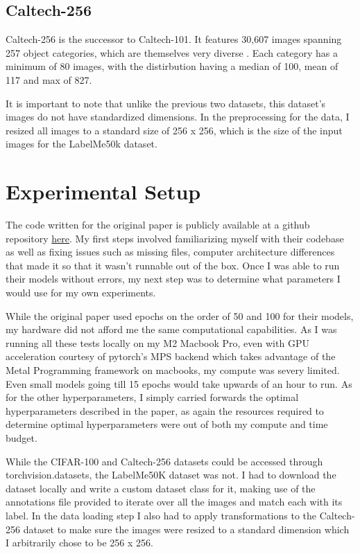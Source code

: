 \documentclass{article}
\theoremstyle{plain}
\theoremstyle{definition}
\theoremstyle{remark}
\begin{document}
\subsection*{Caltech-256}

Caltech-256 is the successor to Caltech-101. It features 30,607 images spanning 
257 object categories, which are themselves very diverse \cite{caltech256}. Each category 
has a minimum of 80 images, with the distirbution having a median of 100, mean of 117 and max of 
827. 

It is important to note that unlike the previous two datasets, this dataset's images do not have standardized dimensions. 
In the preprocessing for the data, I resized all images to a standard size of 256 x 256, which is the size 
of the input images for the LabelMe50k dataset.

\section{Experimental Setup}

The code written for the original paper \cite{alonso2024understanding} is publicly available at a 
github repository \href{https://github.com/nalonso2/PredictiveCoding-MQSeqIL/tree/main}{here}. My first steps 
involved familiarizing myself with their codebase as well as fixing issues such as missing files, computer 
architecture differences that made it so that it wasn't runnable out of the box. Once I was able to run their models 
without errors, my next step was to determine what parameters I would use for my own experiments. 

While the original paper used epochs on the order of 50 and 100 for their models, my hardware did not afford me the same 
computational capabilities. As I was running all these tests locally on my M2 Macbook Pro, even with GPU acceleration courtesy of 
pytorch's MPS backend which takes advantage of the Metal Programming framework on macbooks, my compute was severy limited. Even small models 
going till 15 epochs would take upwards of an hour to run. As for the other hyperparameters, I simply carried forwards the optimal 
hyperparameters described in the paper, as again the resources required to determine optimal hyperparameters were out of both 
my compute and time budget. 

While the CIFAR-100 and Caltech-256 datasets could be accessed through torchvision.datasets, the LabelMe50K 
dataset was not. I had to download the dataset locally and write a custom dataset class for it, making use of the annotations file
provided to iterate over all the images and match each with its label. In the data loading step I also had to apply 
transformations to the Caltech-256 dataset to make sure the images were resized to a standard dimension which I arbitrarily
chose to be 256 x 256. 
\end{document}
